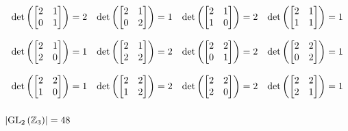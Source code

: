 \begin{mdframed}[style=darkAnswer,frametitle={Joe Starr}]
$$\begin{matrix}
\text{det}\left(\begin{bmatrix} 2 & 1 \\ 0 & 1 \end{bmatrix}\right)= 2 &
\text{det}\left(\begin{bmatrix} 2 & 1 \\ 0 & 2 \end{bmatrix}\right)= 1 &
\text{det}\left(\begin{bmatrix} 2 & 1 \\ 1 & 0 \end{bmatrix}\right)= 2 &
\text{det}\left(\begin{bmatrix} 2 & 1 \\ 1 & 1 \end{bmatrix}\right)= 1 \\ \hspace{.5in} \\
\text{det}\left(\begin{bmatrix} 2 & 1 \\ 2 & 0 \end{bmatrix}\right)= 1 &
\text{det}\left(\begin{bmatrix} 2 & 1 \\ 2 & 2 \end{bmatrix}\right)= 2 &
\text{det}\left(\begin{bmatrix} 2 & 2 \\ 0 & 1 \end{bmatrix}\right)= 2 &
\text{det}\left(\begin{bmatrix} 2 & 2 \\ 0 & 2 \end{bmatrix}\right)= 1 \\ \hspace{.5in} \\
\text{det}\left(\begin{bmatrix} 2 & 2 \\ 1 & 0 \end{bmatrix}\right)= 1 &
\text{det}\left(\begin{bmatrix} 2 & 2 \\ 1 & 2 \end{bmatrix}\right)= 2 &
\text{det}\left(\begin{bmatrix} 2 & 2 \\ 2 & 0 \end{bmatrix}\right)= 2 &
\text{det}\left(\begin{bmatrix} 2 & 2 \\ 2 & 1 \end{bmatrix}\right)= 1 \\ \hspace{.5in} \\
\end{matrix}
$$
$\left|\mathrm{GL}_{2}\left(\mathbf{\mathbb{Z}}_{3}\right)\right|=48$
\end{mdframed}

